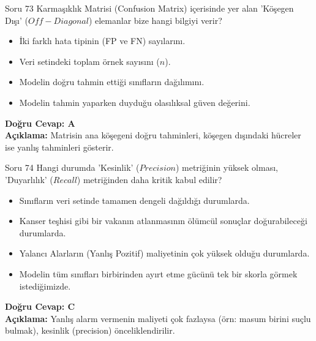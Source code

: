 \documentclass[12pt,a4paper]{article}
\begin{document}
\begin{testcard}{Soru 73}
    Karmaşıklık Matrisi (Confusion Matrix) içerisinde yer alan 'Köşegen Dışı' ($Off-Diagonal$) elemanlar bize hangi bilgiyi verir?
    \begin{itemize}
        \item[A)] İki farklı hata tipinin (FP ve FN) sayılarını.
        \item[B)] Veri setindeki toplam örnek sayısını ($n$).
        \item[C)] Modelin doğru tahmin ettiği sınıfların dağılımını.
        \item[D)] Modelin tahmin yaparken duyduğu olasılıksal güven değerini.
    \end{itemize}
    \tcblower
    \textbf{Doğru Cevap: A} \\
    \textbf{Açıklama:} Matrisin ana köşegeni doğru tahminleri, köşegen dışındaki hücreler ise yanlış tahminleri gösterir.
\end{testcard}

\begin{testcard}{Soru 74}
    Hangi durumda 'Kesinlik' ($Precision$) metriğinin yüksek olması, 'Duyarlılık' ($Recall$) metriğinden daha kritik kabul edilir?
    \begin{itemize}
        \item[A)] Sınıfların veri setinde tamamen dengeli dağıldığı durumlarda.
        \item[B)] Kanser teşhisi gibi bir vakanın atlanmasının ölümcül sonuçlar doğurabileceği durumlarda.
        \item[C)] Yalancı Alarların (Yanlış Pozitif) maliyetinin çok yüksek olduğu durumlarda.
        \item[D)] Modelin tüm sınıfları birbirinden ayırt etme gücünü tek bir skorla görmek istediğimizde.
    \end{itemize}
    \tcblower
    \textbf{Doğru Cevap: C} \\
    \textbf{Açıklama:} Yanlış alarm vermenin maliyeti çok fazlaysa (örn: masum birini suçlu bulmak), kesinlik (precision) önceliklendirilir.
\end{testcard}
\end{document}
